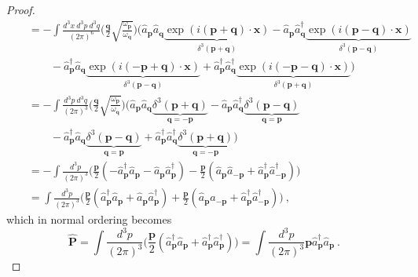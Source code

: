\begin{proof}
\begin{equation*}
\begin{aligned}
            \phantom{\hat{\mathbf P}} & = - \int \frac{d^3 x ~ d^3 p ~ d^3 q}{{(2\pi)}^6} \Big (\frac{\mathbf q}{2} \sqrt{\frac{\omega_{\mathbf p}}{\omega_{\mathbf q}}} \Big ) (\hat a_{\mathbf p} \hat a_{\mathbf q} \underbrace{\exp(i (\mathbf p + \mathbf q) \cdot \mathbf x)}_{\delta^3 (\mathbf p + \mathbf q)} - \hat a_{\mathbf p} \hat a_{\mathbf q}^\dagger \underbrace{\exp(i (\mathbf p - \mathbf q) \cdot \mathbf x)}_{\delta^3 (\mathbf p - \mathbf q)} \\ & \qquad - \hat a_{\mathbf p}^\dagger \hat a_{\mathbf q} \underbrace{\exp(i (-\mathbf p + \mathbf q) \cdot \mathbf x)}_{\delta^3 (\mathbf p - \mathbf q)} + \hat a_{\mathbf p}^\dagger \hat a_{\mathbf q}^\dagger \underbrace{\exp(i (-\mathbf p - \mathbf q) \cdot \mathbf x)}_{\delta^3 (\mathbf p + \mathbf q)} ) \\ & = - \int \frac{d^3 p ~ d^3 q}{{(2\pi)}^3} \Big (\frac{\mathbf q}{2} \sqrt{\frac{\omega_{\mathbf p}}{\omega_{\mathbf q}}} \Big ) (\hat a_{\mathbf p} \hat a_{\mathbf q} \underbrace{\delta^3 (\mathbf p + \mathbf q) }_{\mathbf q = - \mathbf p} - \hat a_{\mathbf p} \hat a_{\mathbf q}^\dagger \underbrace{\delta^3 (\mathbf p - \mathbf q) }_{\mathbf q = \mathbf p} \\ & \qquad - \hat a_{\mathbf p}^\dagger \hat a_{\mathbf q} \underbrace{\delta^3 (\mathbf p - \mathbf q) }_{\mathbf q = \mathbf p} + \hat a_{\mathbf p}^\dagger \hat a_{\mathbf q}^\dagger \underbrace{\delta^3 (\mathbf p + \mathbf q) }_{\mathbf q = - \mathbf p}) \\ & = - \int \frac{d^3 p}{{(2\pi)}^3} \Big (\frac{\mathbf p}{2} (- \hat a_{\mathbf p}^\dagger \hat a_{\mathbf p} - \hat a_{\mathbf p} \hat a_{\mathbf p}^\dagger) - \frac{\mathbf p}{2} (\hat a_{\mathbf p} \hat a_{- \mathbf p} + \hat a_{\mathbf p}^\dagger \hat a_{- \mathbf p}^\dagger) \Big) \\ & = \int \frac{d^3 p}{{(2\pi)}^3} \Big (\frac{\mathbf p}{2} (\hat a_{\mathbf p}^\dagger \hat a_{\mathbf p} + \hat a_{\mathbf p} \hat a_{\mathbf p}^\dagger) + \frac{\mathbf p}{2} (\hat a_{\mathbf p} \hat a_{- \mathbf p} + \hat a_{\mathbf p}^\dagger \hat a_{- \mathbf p}^\dagger) \Big)  ~,
        \end{aligned}
        \end{equation*}
        which in normal ordering becomes 
        \begin{equation*}
            \hat{\mathbf P} = \int \frac{d^3 p}{{(2\pi)}^3} \Big (\frac{\mathbf p}{2} (\hat a_{\mathbf p}^\dagger \hat a_{\mathbf p} + \hat a_{\mathbf p}^\dagger \hat a_{\mathbf p}^\dagger) \Big) = \int \frac{d^3 p}{{(2\pi)}^3} \mathbf p \hat a_{\mathbf p}^\dagger \hat a_{\mathbf p} ~.
        \end{equation*}
    \end{proof}

